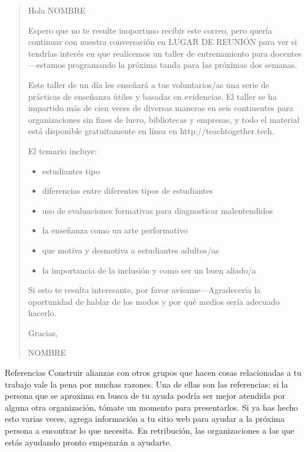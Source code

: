 \begin{quote}

  \noindent
  Hola NOMBRE
 
 Espero que no te resulte inoportuno recibir este correo,
 pero quería continuar con nuestra conversación en LUGAR DE REUNIÓN
 para ver si tendrías interés en que realicemos un taller de entrenamiento para docentes---estamos programando  la próxima tanda para las próximas dos semanas.

 Este taller de un día les enseñará a tus voluntarios/as
 una serie de prácticas de enseñanza útiles y basadas en evidencias.
El taller se ha impartido más de cien veces de diversas maneras en seis continentes
 para organizaciones sin fines de lucro, bibliotecas y empresas,
 y todo el material está disponible gratuitamente en línea en http://teachtogether.tech.
 
El temario incluye:

  \begin{itemize}
  \item estudiantes tipo
  \item  diferencias entre diferentes tipos de estudiantes 
  \item uso de evaluaciones formativas para diagnosticar malentendidos
  \item la enseñanza como un arte performativo
  \item que motiva y desmotiva a estudiantes adultos/as
  \item la importancia de la inclusión y como ser un buen aliado/a
  \end{itemize}

Si esto te resulta interesante,
por favor avísame---Agradecería la oportunidad de hablar de los modos 
y por qué medios sería adecuado hacerlo.

Gracias,

  NOMBRE

\end{quote}

\begin{aside}{Referencias}
Construir alianzas con otros grupos que hacen cosas relacionadas a tu trabajo
vale la pena por muchas razones.
Una de ellas son las referencias:
si la persona que se aproxima en busca de tu ayuda podría ser mejor atendida por alguna otra organización,
tómate un momento para presentarlos.
Si ya has hecho esto varias veces,
agrega información a tu sitio web para ayudar a la próxima persona a encontrar lo que necesita.
En retribución, las organizaciones a las que estás ayudando pronto empezarán a ayudarte.
\end{aside}

